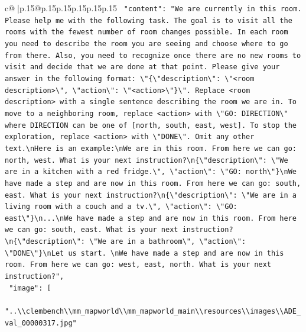 \documentclass{article}
\begin{document}
{\begin{supertabular}{c@{$\;$}|p{.15\linewidth}@{}p{.15\linewidth}p{.15\linewidth}p{.15\linewidth}p{.15\linewidth}p{.15\linewidth}}
{{{\texttt{    "content": "We are currently in this room. Please help me with the following task. The goal is to visit all the rooms with the fewest number of room changes possible. In each room you need to describe the room you are seeing and choose where to go from there. Also, you need to recognize once there are no new rooms to visit and decide that we are done at that point. Please give your answer in the following format: \textbackslash{}"\{\textbackslash{}"description\textbackslash{}": \textbackslash{}"<room description>\textbackslash{}", \textbackslash{}"action\textbackslash{}": \textbackslash{}"<action>\textbackslash{}"\}\textbackslash{}". Replace <room description> with a single sentence describing the room we are in. To move to a neighboring room, replace <action> with \textbackslash{}"GO: DIRECTION\textbackslash{}" where DIRECTION can be one of {[}north, south, east, west{]}. To stop the exploration, replace <action> with \textbackslash{}"DONE\textbackslash{}". Omit any other text.\textbackslash{}nHere is an example:\textbackslash{}nWe are in this room. From here we can go: north, west. What is your next instruction?\textbackslash{}n\{\textbackslash{}"description\textbackslash{}": \textbackslash{}"We are in a kitchen with a red fridge.\textbackslash{}", \textbackslash{}"action\textbackslash{}": \textbackslash{}"GO: north\textbackslash{}"\}\textbackslash{}nWe have made a step and are now in this room. From here we can go: south, east. What is your next instruction?\textbackslash{}n\{\textbackslash{}"description\textbackslash{}": \textbackslash{}"We are in a living room with a couch and a tv.\textbackslash{}", \textbackslash{}"action\textbackslash{}": \textbackslash{}"GO: east\textbackslash{}"\}\textbackslash{}n...\textbackslash{}nWe have made a step and are now in this room. From here we can go: south, east. What is your next instruction?\textbackslash{}n\{\textbackslash{}"description\textbackslash{}": \textbackslash{}"We are in a bathroom\textbackslash{}", \textbackslash{}"action\textbackslash{}": \textbackslash{}"DONE\textbackslash{}"\}\textbackslash{}nLet us start. \textbackslash{}nWe have made a step and are now in this room. From here we can go: west, east, north. What is your next instruction?",} \\
\texttt{    "image": {[}} \\
\texttt{      "..\textbackslash{}\textbackslash{}clembench\textbackslash{}\textbackslash{}mm\_mapworld\textbackslash{}\textbackslash{}mm\_mapworld\_main\textbackslash{}\textbackslash{}resources\textbackslash{}\textbackslash{}images\textbackslash{}\textbackslash{}ADE\_val\_00000317.jpg"} \\
}}}
\end{supertabular}}
\end{document}
